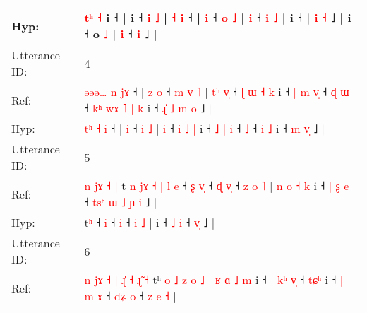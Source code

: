\documentclass[10pt]{article}
\DeclareRobustCommand{\hl}[1]{{\textcolor{red}{#1}}}
\begin{document}
\begin{longtable}{ll}
 \\
Hyp: & \hl{}\hl{t}\hl{ʰ} \hl{˧} i ˧ |\hl{}\hl{}\hl{}\hl{}\hl{}\hl{} i ˧\hl{}\hl{} \hl{i} \hl{˩} | \hl{˧} \hl{}\hl{i} ˧ |\hl{}\hl{} \hl{i} ˧\hl{}\hl{} \hl{}\hl{o} \hl{˩} |\hl{}\hl{}\hl{}\hl{} \hl{i} ˧\hl{}\hl{} \hl{i} \hl{˩} |\hl{}\hl{}\hl{}\hl{}\hl{}\hl{}\hl{}\hl{} i ˧\hl{} | \hl{i} \hl{}\hl{˧} ˩\hl{} |\hl{}\hl{}\hl{}\hl{}\hl{}\hl{}\hl{}\hl{} i ˧\hl{}\hl{}\hl{}\hl{} o \hl{˩} |\hl{}\hl{}\hl{}\hl{}\hl{}\hl{}\hl{}\hl{}\hl{} \hl{}\hl{i} ˧\hl{}\hl{} \hl{i} ˩\hl{}\hl{}\hl{}\hl{}\hl{}\hl{}\hl{} |
 \\
\midrule
Utterance ID: & 4 \\
Ref: & \hl{ə}\hl{ə}\hl{ə}\hl{…} \hl{n} \hl{j}\hl{ɤ} ˧ |\hl{ }\hl{z} \hl{o} ˧\hl{ }\hl{m} \hl{v}\hl{̩} \hl{˥} |\hl{ }\hl{t}\hl{ʰ} \hl{v}\hl{̩} ˧\hl{ }\hl{ɭ} \hl{ɯ} \hl{˧} \hl{k} i ˧ \hl{|} \hl{m} \hl{v}\hl{̩} ˧\hl{ }\hl{ɖ} \hl{ɯ} ˧\hl{ }\hl{k}\hl{ʰ}\hl{ }\hl{w}\hl{ɤ}\hl{ }\hl{˥} \hl{|} \hl{k} i ˧\hl{ }\hl{ɻ}\hl{̍} \hl{˩} \hl{m}\hl{ }\hl{o} ˩ |
 \\
Hyp: & \hl{}\hl{}\hl{t}\hl{ʰ} \hl{˧} \hl{}\hl{i} ˧ |\hl{}\hl{} \hl{i} ˧\hl{}\hl{} \hl{}\hl{i} \hl{˩} |\hl{}\hl{}\hl{} \hl{}\hl{i} ˧\hl{}\hl{} \hl{i} \hl{˩} \hl{|} i ˧ \hl{˩} \hl{|} \hl{}\hl{i} ˧\hl{}\hl{} \hl{˩} ˧\hl{}\hl{}\hl{}\hl{}\hl{}\hl{}\hl{}\hl{} \hl{i} \hl{˩} i ˧\hl{}\hl{}\hl{} \hl{m} \hl{}\hl{v}\hl{̩} ˩ |
 \\
\midrule
Utterance ID: & 5 \\
Ref: & \hl{n}\hl{ }\hl{j}\hl{ɤ}\hl{ }\hl{˧}\hl{ }\hl{|}\hl{ }t\hl{ }\hl{n}\hl{ }\hl{j}\hl{ɤ}\hl{ }\hl{˧}\hl{ }\hl{|}\hl{ }\hl{l}\hl{ }\hl{e} ˧\hl{ }\hl{ʂ} \hl{v}\hl{̩} ˧\hl{ }\hl{ɖ} \hl{v}\hl{̩} ˧\hl{ }\hl{z} \hl{o} \hl{˥} |\hl{ }\hl{n}\hl{ }\hl{o}\hl{ }\hl{˧}\hl{ }\hl{k} i ˧\hl{ }\hl{|} \hl{ʂ} \hl{e} ˧\hl{ }\hl{t}\hl{s}\hl{ʰ}\hl{ }\hl{ɯ}\hl{ }\hl{˩} \hl{ɲ}\hl{ }\hl{i} ˩ |
 \\
Hyp: & \hl{}\hl{}\hl{}\hl{}\hl{}\hl{}\hl{}\hl{}\hl{}t\hl{}\hl{}\hl{}\hl{}\hl{}\hl{}\hl{}\hl{}\hl{}\hl{}\hl{}\hl{}\hl{ʰ} ˧\hl{}\hl{} \hl{}\hl{i} ˧\hl{}\hl{} \hl{}\hl{i} ˧\hl{}\hl{} \hl{i} \hl{˩} |\hl{}\hl{}\hl{}\hl{}\hl{}\hl{}\hl{}\hl{} i ˧\hl{}\hl{} \hl{˩} \hl{i} ˧\hl{}\hl{}\hl{}\hl{}\hl{}\hl{}\hl{}\hl{} \hl{}\hl{v}\hl{̩} ˩ |
 \\
\midrule
Utterance ID: & 6 \\
Ref: & \hl{n}\hl{ }\hl{j}\hl{ɤ}\hl{ }\hl{˧}\hl{ }\hl{|}\hl{ }\hl{ɻ}\hl{̍}\hl{ }\hl{˧}\hl{ }\hl{ɻ}\hl{̃}\hl{ }\hl{˧}\hl{ }tʰ\hl{ }\hl{o}\hl{ }\hl{˩}\hl{ }\hl{z}\hl{ }\hl{o}\hl{ }\hl{˩}\hl{ }\hl{|}\hl{ }\hl{ʁ}\hl{ }\hl{ɑ}\hl{ }\hl{˩} \hl{m} i ˧\hl{ }\hl{|}\hl{ }\hl{k}\hl{ʰ} \hl{v}\hl{̩} ˧\hl{ }\hl{t}\hl{ɕ}\hl{ʰ} i ˧\hl{ }\hl{|}\hl{ }\hl{m} \hl{ɤ} ˧\hl{ }\hl{d}\hl{ʑ} \hl{o} ˧\hl{ }\hl{z} \hl{e} \hl{˧} |

\end{longtable}
\end{document}
